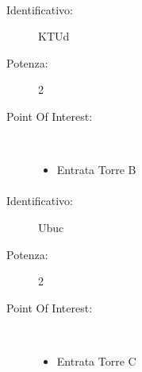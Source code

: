 \documentclass[../SperimentazioniPratiche.tex]{subfiles}
\begin{document}
			\paragraph*{}
			\label{00001}
			\begin{tcolorbox}[fonttitle=\bfseries, 
								adjusted title={\Large Beacon 00001},
								sharp corners=south,
								colback=white, 
								colframe=white!50!blue!75!black]
								
				\begin{description}%
					\item[Identificativo:] KTUd
					\item[Potenza:] 2

					\tcbline					
					
					\item[Point Of Interest:] \ \par
					\begin{itemize}
						\item Entrata Torre B
					\end{itemize}					   				
				\end{description}  				
			\end{tcolorbox}
			
			\paragraph*{}
			\label{00002}
			\begin{tcolorbox}[fonttitle=\bfseries, 
								adjusted title={\Large Beacon 00002},
								sharp corners=south,
								colback=white, 
								colframe=white!50!blue!75!black]
								
				\begin{description}%
					\item[Identificativo:] Ubuc
					\item[Potenza:] 2

					\tcbline					
					
					\item[Point Of Interest:] \ \par
					\begin{itemize}
						\item Entrata Torre C
					\end{itemize}					   				
				\end{description}  				
			\end{tcolorbox}
			
\end{document}
